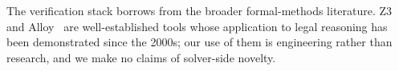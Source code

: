The verification stack borrows from the broader formal-methods
literature. Z3~\cite{demoura2008z3} and Alloy~\cite{jackson2002alloy}
are well-established tools whose application to legal reasoning has
been demonstrated since the 2000s; our use of them is engineering
rather than research, and we make no claims of solver-side novelty.
